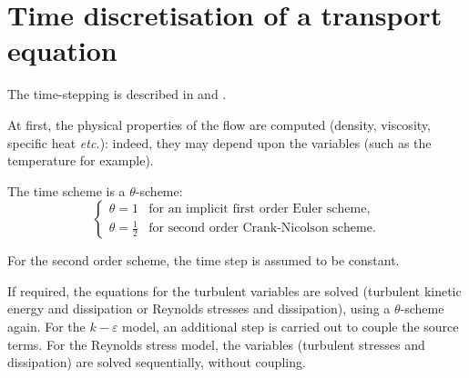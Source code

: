 
%
%
%
%


\section{Time discretisation of a transport equation}

The time-stepping is described in \cite{ferrand:tel-03637275} and \cite{Amino:2022}.

At first, the physical properties of the flow are computed (density,
viscosity, specific heat \emph{etc.}): indeed, they may depend upon the variables
(such as the temperature for example).

The time scheme is a $\theta$-scheme:
\begin{equation}
\left\{%
\begin{array}{ll}
\theta = 1 & \text{for an implicit first order Euler scheme}, \\
\theta = \frac{1}{2} & \text{for second order Crank-Nicolson scheme}.
\end{array}
\right.
\end{equation}

For the second order scheme, the time step is assumed to be constant.

If required, the equations for the turbulent variables are solved (turbulent
kinetic energy and dissipation or Reynolds stresses and dissipation), using
a $\theta$-scheme again. For the $k-\varepsilon$ model, an additional step
is carried out to couple the source terms. For the Reynolds stress model,
the variables (turbulent stresses and dissipation) are solved sequentially,
without coupling.

